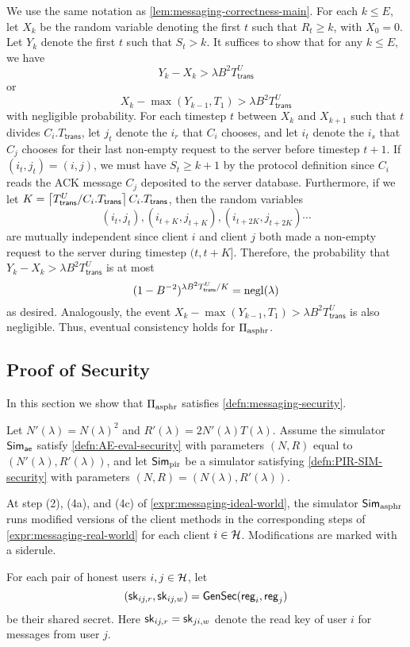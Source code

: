  We use the same notation as \cref{lem:messaging-correctness-main}. For each $k \leq E$, let $X_k$ be the random variable denoting the first $t$ such that $R_t \geq k$, with $X_0 = 0$. Let $Y_k$ denote the first $t$ such that $S_{t} > k$. It suffices to show that for any $k \leq E$, we have
 $$Y_k - X_k > \lambda B^2 T^U_{\mathsf{trans}}$$
 or
 $$X_{k} - \max(Y_{k - 1}, T_1) > \lambda B^2 T^U_{\mathsf{trans}}$$
 with negligible probability. For each timestep $t$ between $X_k$ and $X_{k + 1}$ such that $t$ divides $C_i.T_{\mathsf{trans}}$, let $j_t$ denote the $i_r$ that $C_i$ chooses, and let $i_t$ denote the $i_s$ that $C_j$ chooses for their last non-empty request to the server before timestep $t + 1$. If $(i_t, j_t) = (i, j)$, we must have $S_{t} \geq k + 1$ by the protocol definition since $C_i$ reads the ACK message $C_j$ deposited to the server database. Furthermore, if we let $K = \left\lceil T^U_{\mathsf{trans}} / C_i.T_{\mathsf{trans}} \right\rceil C_i.T_{\mathsf{trans}}$, then the random variables
 $$(i_t, j_t), (i_{t + K}, j_{t + K}), (i_{t + 2K}, j_{t + 2K})\cdots$$
are mutually independent since client $i$ and client $j$ both made a non-empty request to the server during timestep $(t, t + K]$. Therefore, the probability that $Y_k - X_k > \lambda B^2 T^U_{\mathsf{trans}}$ is at most
$$(1 - B^{-2})^{\lambda B^2 T^U_{\mathsf{trans}} / K} = \operatorname{negl}(\lambda)$$
as desired. Analogously, the event $X_{k} - \max(Y_{k - 1}, T_1) > \lambda B^2 T^U_{\mathsf{trans}}$ is also negligible. Thus, eventual consistency holds for $\Pi_{\text{asphr}}$.
\subsection{Proof of Security}
In this section we show that $\Pi_{\text{asphr}}$ satisfies \cref{defn:messaging-security}. 

Let $N'(\lambda) = N(\lambda)^2$ and $R'(\lambda) = 2N'(\lambda)T(\lambda)$. Assume the simulator $\mathsf{Sim}_{\mathsf{ae}}$ satisfy \cref{defn:AE-eval-security} with parameters $(N, R)$ equal to $(N'(\lambda), R'(\lambda))$, and let $\mathsf{Sim}_{\text{pir}}$ be a simulator satisfying \cref{defn:PIR-SIM-security} with parameters $(N, R) = (N(\lambda), R'(\lambda))$. 

At step (2), (4a), and (4c) of \cref{expr:messaging-ideal-world}, the simulator $\mathsf{Sim}_{\text{asphr}}$ runs modified versions of the client methods in the corresponding steps of \cref{expr:messaging-real-world} for each client $i \in \mathcal{H}$. Modifications are marked with a siderule. 

For each pair of honest users $i, j \in \mathcal{H}$, let 
$$({\mathsf{sk}}_{ij, r}, {\mathsf{sk}}_{ij, w}) = \mathsf{GenSec}(\mathsf{reg}_i, \mathsf{reg}_j)$$ 
be their shared secret. Here ${\mathsf{sk}}_{ij, r} = {\mathsf{sk}}_{ji, w}$ denote the read key of user $i$ for messages from user $j$.

